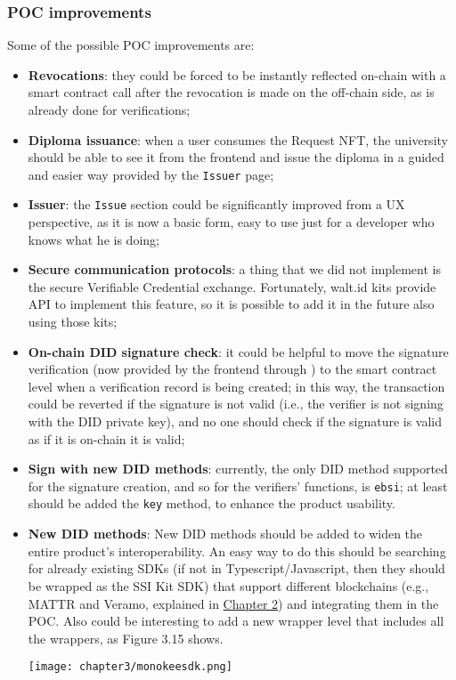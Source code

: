 \subsubsection{POC improvements}
Some of the possible POC improvements are:
\begin{itemize}
    \item \textbf{Revocations}: they could be forced to be instantly reflected on-chain
    with a smart contract call after the revocation is made on the off-chain side, as
    is already done for verifications;
    \item \textbf{Diploma issuance}: when a user consumes the Request NFT, the university
    should be able to see it from the frontend and issue the diploma in a guided and
    easier way provided by the \texttt{Issuer} page;
    \item \textbf{Issuer}: the \texttt{Issue} section could be significantly improved from
    a UX perspective, as it is now a basic form, easy to use just for a developer who
    knows what he is doing;
    \item \textbf{Secure communication protocols}: a thing that we did not implement is the
    secure Verifiable Credential exchange. Fortunately, walt.id kits provide API to
    implement this feature, so it is possible to add it in the future also using those kits;
    \item \textbf{On-chain DID signature check}: it could be helpful to move the signature 
    verification (now provided by the frontend through ) to the 
    smart contract level when a verification record is being created;
    in this way, the transaction could be reverted if the signature is not valid (i.e., 
    the verifier is not signing with the DID private key), and no one should check if 
    the signature is valid as if it is on-chain it is valid;
    \item \textbf{Sign with new DID methods}: currently, the only DID method supported 
    for the signature creation, and so for the verifiers' functions, is \texttt{ebsi}; 
    at least should be added the \texttt{key} method, to enhance the product usability.
    \item \textbf{New DID methods}: New DID methods should be added to widen the entire 
    product's interoperability. An easy way to do this should be searching for already 
    existing SDKs (if not in Typescript/Javascript, then they should be wrapped as the 
    SSI Kit SDK) that support different blockchains (e.g., MATTR and Veramo, explained
    in \hyperref[otherSDKs]{Chapter 2}) and integrating them in the POC. Also could be 
    interesting to add a new wrapper level that includes all the wrappers, as Figure 
    3.15 shows.
    \begin{center}
        \hspace{-1cm}
        \texttt{[image: chapter3/monokeesdk.png]}
        \vspace{-0.3cm}
    \end{center}
\end{itemize}
